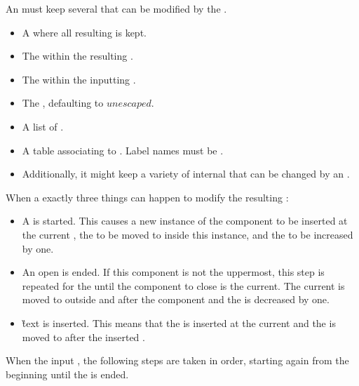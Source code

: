 

An  must keep several  that can be modified by the .

\begin{itemize}
\item A   where all resulting  is kept.
\item The  within the resulting .
\item The  within the inputting .
\item The , defaulting to \inline$unescaped$.
\item A list of .
\item A table associating  to . Label names must be .
\item Additionally, it might keep a variety of internal  that can be changed by an .
\end{itemize}

When  a  exactly three things can happen to modify the resulting :

\begin{itemize}
\item A  is started. This causes a new instance of the component to be inserted at the current , the  to be moved to inside this instance, and the  to be increased by one.
\item An open  is ended. If this component is not the uppermost, this step is repeated for the  until the component to close is the current. The current  is moved to outside and after the component and the  is decreased by one.
\item \G{text} is inserted. This means that the  is inserted at the current  and the  is moved to after the inserted .
\end{itemize}

When  the input , the following steps are taken in order, starting again from the beginning until the   is ended.

